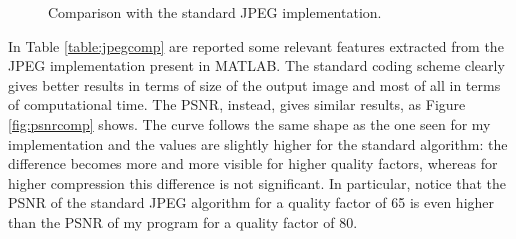 \documentclass[14pt,a4paper]{extarticle}
\begin{document}
\begin{figure}[ht!]
     \begin{center}
%
    \end{center}
    \caption{Comparison with the standard JPEG implementation.}
    \label{fig:jpegcomp}
\end{figure}

In Table \ref{table:jpegcomp} are reported some relevant features extracted from the JPEG implementation present in MATLAB. The standard coding scheme clearly gives better results in terms of size of the output image and most of all in terms of computational time. The PSNR, instead, gives similar results, as Figure \ref{fig:psnrcomp} shows. The curve follows the same shape as the one seen for my implementation and the values are slightly higher for the standard algorithm: the difference becomes more and more visible for higher quality factors, whereas for higher compression this difference is not significant. In particular, notice that the PSNR of the standard JPEG algorithm for a quality factor of 65 is even higher than the PSNR of my program for a quality factor of 80.
\end{document}
